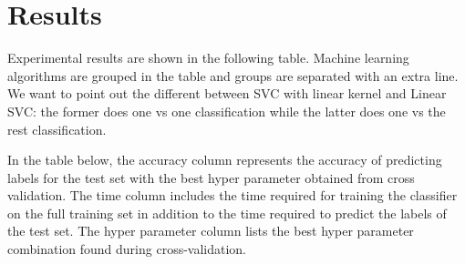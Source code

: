 \section{Results}

Experimental results are shown in the following table. Machine
learning algorithms are grouped in the table and groups are separated
with an extra line. We want to point out the different between SVC
with linear kernel and Linear SVC: the former does one vs one
classification while the latter does one vs the rest classification. 

In the table below, the accuracy column represents the accuracy of
predicting labels for the test set with the best hyper parameter
obtained from cross validation. The time column includes the time
required for training the classifier on the full training set in
addition to the time required to predict the labels of the test
set. The hyper parameter column lists the best hyper parameter
combination found during cross-validation. 

